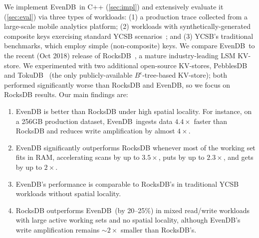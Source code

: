 \documentclass[sigplan,10pt]{acmart}
\newcommand{\inred}[1]{{\color{red}{#1}}}
\newcommand{\sys}{EvenDB}
\providecommand{\DIFadd}[1]{{\protect\color{blue}\uwave{#1}}} %
\providecommand{\DIFdel}[1]{{\protect\color{red}\sout{#1}}}                      %
\providecommand{\DIFaddbegin}{} %
\providecommand{\DIFaddend}{} %
\providecommand{\DIFdelbegin}{} %
\providecommand{\DIFdelend}{} %
\begin{document}
We implement \sys\ in  C++ (\cref{sec:impl}) and extensively evaluate it (\cref{sec:eval})
via three types of workloads: (1) a production trace collected from a large-scale mobile analytics platform; 
(2)  workloads with synthetically-generated composite keys exercising  standard YCSB scenarios~\cite{YCSB};
and (3)  YCSB's traditional benchmarks, which employ simple (non-composite) keys.  
We compare \sys\ to the recent (Oct 2018) release of RocksDB~\cite{RocksDB}, a mature industry-leading LSM KV-store. 
We  experimented with two additional open-source KV-stores, PebblesDB~\cite{PebblesDB}  and  
TokuDB~\cite{TokuDB} (the only publicly-available $B^{\epsilon}$-tree-based 
KV-store); both performed significantly worse than  RocksDB and \sys, so we focus on RocksDB results. 
Our main findings are: 
\begin{enumerate} 
\item \sys\/ is  better than RocksDB under high spatial  locality.  
For instance, on a 256GB production dataset, \sys\ ingests data \DIFdelbegin \DIFdel{$4.4\times$ }\DIFdelend \DIFaddbegin \DIFadd{4.4x }\DIFaddend faster than RocksDB %
and reduces write amplification by almost \DIFdelbegin \DIFdel{$4\times$}\DIFdelend \DIFaddbegin \DIFadd{4x}\DIFaddend . 
\item \sys\/ significantly outperforms RocksDB whenever most of the working set fits in RAM, 
accelerating scans by up to \DIFdelbegin \DIFdel{$3.5\times$}\DIFdelend \DIFaddbegin \DIFadd{$3.5$x}\DIFaddend , puts by up to \DIFdelbegin \DIFdel{$2.3\times$}\DIFdelend \DIFaddbegin \DIFadd{$2.3$x}\DIFaddend , and gets by up to \DIFdelbegin \DIFdel{$2\times$}\DIFdelend \DIFaddbegin \DIFadd{$2$x}\DIFaddend . 
\item \sys's performance is  comparable to RocksDB's in traditional YCSB workloads without spatial locality.
\item RocksDB outperforms \sys\ (by 20--25\%)  in mixed read/write workloads with large active working sets and no spatial locality, 
although \sys's write amplification remains \DIFdelbegin \DIFdel{$\sim2\times$ }\DIFdelend \DIFaddbegin \DIFadd{$\sim$2x }\DIFaddend smaller than RocksDB's. 
\end{enumerate}
\end{document}

